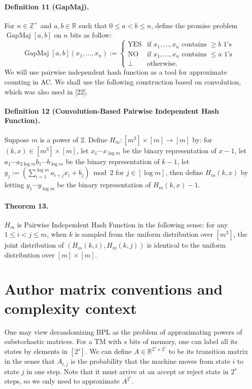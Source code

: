 \documentclass[10pt,a4paper]{article}
\begin{document}
\paragraph{Definition 11 (GapMaj).} For $n\in\mathbb Z^+$ and $a,b\in\mathbb R$ such that $0\le a<b\le n$, define the promise problem $\operatorname{GapMaj}[a,b]$ on $n$ bits as follow:
\[\operatorname{GapMaj}[a,b](x_1,\ldots,x_n):=\begin{cases}\mathrm{YES}&\text{if }x_1,\ldots,x_n\text{ contains }\ge b\text{ 1's}\\\mathrm{NO}&\text{if }x_1,\ldots,x_n\text{ contains }\le a\text{ 1's}\\\bot&\text{otherwise.}\end{cases}\]
We will use pairwise independent hash function as a tool for approximate counting in AC. We shall use the following construction based on convolution, which was also used in [22].
\paragraph{Definition 12 (Convolution-Based Pairwise Independent Hash Function).} Suppose $m$ is a power of 2. Define $H_m:[m^3]\times[m]\to[m]$ by: for $(k,x)\in[m^3]\times[m]$, let $x_1\cdots x_{\log m}$ be the binary representation of $x-1$, let $a_1\cdots a_{2\log m}b_1\cdots b_{\log m}$ be the binary representation of $k-1$, let $y_j:=(\sum_{i=1}^{\log m}a_{i+j}x_i+b_j)\bmod2$ for $j\in[\log m]$, then define $H_m(k,x)$ by letting $y_1\cdots y_{\log m}$ be the binary representation of $H_m(k,x)-1$.
\paragraph{Theorem 13.} $H_m$ is Pairwise Independent Hash Function in the following sense: for any $1\le i<j\le m$, when $k$ is sampled from the uniform distribution over $[m^3]$, the joint distribution of $(H_m(k,i),H_m(k,j))$ is identical to the uniform distribution over $[m]\times[m]$.

\section*{Author matrix conventions and complexity context}
One may view derandomizing BPL as the problem of approximating powers of substochastic matrices. For a TM with $s$ bits of memory, one can label all its states by elements in $[2^s]$. We can define $A\in\mathbb R^{2^s\times2^s}$ to be its transition matrix in the sense that $A_{i,j}$ is the probability that the machine moves from state $i$ to state $j$ in one step. Note that it must arrive at an accept or reject state in $2^s$ steps, so we only need to approximate $A^{2^s}$.
\end{document}
